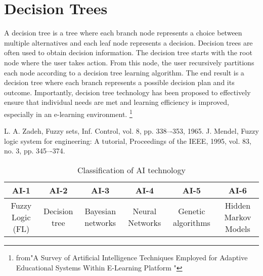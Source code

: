 \documentclass[a4paper,12pt,twocolumn]{article}
\begin{document}
\section{Decision Trees}	
	\par A decision tree is a tree where each branch node represents a choice between multiple alternatives and each leaf node represents a decision. Decision trees are often used to obtain decision information. The decision tree starts with the root node where the user takes action. From this node, the user recursively partitions each node according to a decision tree learning algorithm. The end result is a decision tree where each branch represents a possible decision plan and its outcome. Importantly, decision tree technology has been proposed to effectively ensure that individual needs are met and learning efficiency is improved, especially in an e-learning environment.
		\footnote{from"A Survey of Artificial Intelligence Techniques Employed for   Adaptive Educational  Systems Within E-Learning Platform	"} 

%
 
\begin{thebibliography}{0}
	  L. A. Zadeh, Fuzzy sets, Inf. Control, vol. 8, pp. 338–-353, 1965.
	     J. Mendel, Fuzzy logic system for engineering: A tutorial, Proceedings of the IEEE, 1995, vol. 83, no. 3, pp. 345–-374. 

\end{thebibliography}
	\twocolumn
\begin{table}[!hbp]
	\begin{tabular}{|c|c|c|c|c|c}
		\hline
		\hline
		AI-1 & AI-2 & AI-3 & AI-4 & AI-5 & AI-6\\
		\hline
		Fuzzy Logic (FL) & Decision tree & Bayesian networks & Neural Networks & Genetic algorithms & Hidden Markov Models\\
		\hline
	\end{tabular}
	\caption{Classification of AI technology}\label{table1}
\end{table} 
\end{document}
